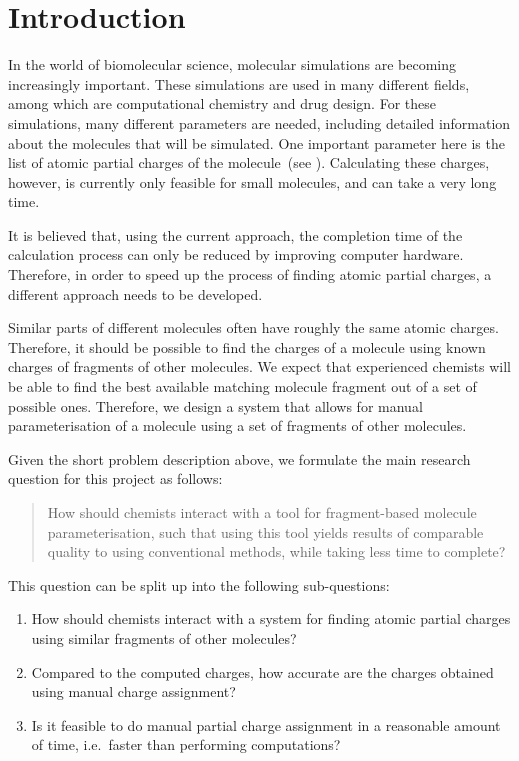 \chapter{Introduction}

In the world of biomolecular science, molecular simulations are becoming increasingly important. These simulations are used in many different fields, among which are computational chemistry and drug design. For these simulations, many different parameters are needed, including detailed information about the molecules that will be simulated. One important parameter here is the list of atomic partial charges of the molecule~(see ). Calculating these charges, however, is currently only feasible for small molecules, and can take a very long time.

It is believed that, using the current approach, the completion time of the calculation process can only be reduced by improving computer hardware. Therefore, in order to speed up the process of finding atomic partial charges, a different approach needs to be developed.

Similar parts of different molecules often have roughly the same atomic charges. Therefore, it should be possible to find the charges of a molecule using known charges of fragments of other molecules. We expect that experienced chemists will be able to find the best available matching molecule fragment out of a set of possible ones. Therefore, we design a system that allows for manual parameterisation of a molecule using a set of fragments of other molecules.

Given the short problem description above, we formulate the main research question for this project as follows:
\begin{quote}
How should chemists interact with a tool for fragment-based molecule parameterisation, such that using this tool yields results of comparable quality to using conventional methods, while taking less time to complete?
\end{quote}

This question can be split up into the following sub-questions:
\begin{enumerate}
\item How should chemists interact with a system for finding atomic partial charges using similar fragments of other molecules?
\item Compared to the computed charges, how accurate are the charges obtained using manual charge assignment?
\item Is it feasible to do manual partial charge assignment in a reasonable amount of time, i.e.\ faster than performing computations?
\end{enumerate}

